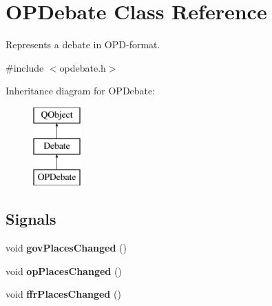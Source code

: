 \hypertarget{classOPDebate}{\section{O\-P\-Debate Class Reference}
\label{classOPDebate}
}


Represents a debate in O\-P\-D-\/format.  




{\ttfamily \#include $<$opdebate.\-h$>$}

Inheritance diagram for O\-P\-Debate\-:\begin{figure}[H]
\begin{center}
\leavevmode
\includegraphics[height=3.000000cm]{classOPDebate}
\end{center}
\end{figure}
\subsection*{Signals}
\begin{DoxyCompactItemize}
\item 
\hypertarget{classOPDebate_a6c83bee3407b751c774280196ccace02}{void {\bfseries gov\-Places\-Changed} ()}\label{classOPDebate_a6c83bee3407b751c774280196ccace02}

\item 
\hypertarget{classOPDebate_a13cb748ff7ab86227f580013425565d7}{void {\bfseries op\-Places\-Changed} ()}\label{classOPDebate_a13cb748ff7ab86227f580013425565d7}

\item 
\hypertarget{classOPDebate_a9ec85e8b2dd66bdf54b23012f625b6ed}{void {\bfseries ffr\-Places\-Changed} ()}\label{classOPDebate_a9ec85e8b2dd66bdf54b23012f625b6ed}

\end{DoxyCompactItemize}
